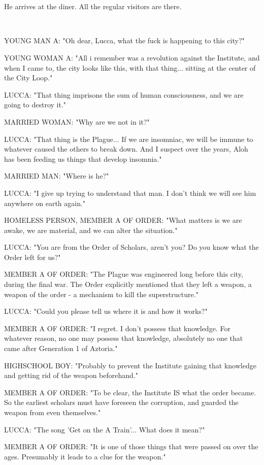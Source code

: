 \documentclass[11pt]{article}
\begin{document}
\ 

\ 

He arrives at the diner.
All the regular visitors are there. 

\ 

YOUNG MAN A: "Oh dear, Lucca, what the fuck is happening to this city?"

YOUNG WOMAN A: "All i remember was a revolution against the Institute, and when I came to, the city looks like this, with that thing... sitting at the center of the City Loop."

LUCCA: "That thing imprisons the sum of human consciousness, and we are going to destroy it."

MARRIED WOMAN: "Why are we not in it?"

LUCCA: "That thing is the Plague... If we are insomniac, we will be immune to whatever caused the others to break down.
And I suspect over the years, Aloh has been feeding us things that develop insomnia."

MARRIED MAN: "Where is he?"

LUCCA: "I give up trying to understand that man.
I don't think we will see him anywhere on earth again."

HOMELESS PERSON, MEMBER A OF ORDER: "What matters is we are awake, we are material, and we can alter the situation."

LUCCA: "You are from the Order of Scholars, aren't you? 
Do you know what the Order left for us?"

MEMBER A OF ORDER: "The Plague was engineered long before this city, during the final war. 
The Order explicitly mentioned that they left a weapon, a weapon of the order - a mechanism to kill the superstructure."

LUCCA: "Could you please tell us where it is and how it works?"

MEMBER A OF ORDER: "I regret. I don't possess that knowledge. For whatever reason, no one may possess that knowledge, absolutely no one that came after Generation 1 of Aztoria."

HIGHSCHOOL BOY: "Probably to prevent the Institute gaining that knowledge and getting rid of the weapon beforehand."

MEMBER A OF ORDER: "To be clear, the Institute IS what the order became. 
So the earliest scholars must have foreseen the corruption, and guarded the weapon from even themselves."

LUCCA: "The song 'Get on the A Train'... What does it mean?"

MEMBER A OF ORDER: "It is one of those things that were passed on over the ages. 
Presumably it leads to a clue for the weapon."
\end{document}
